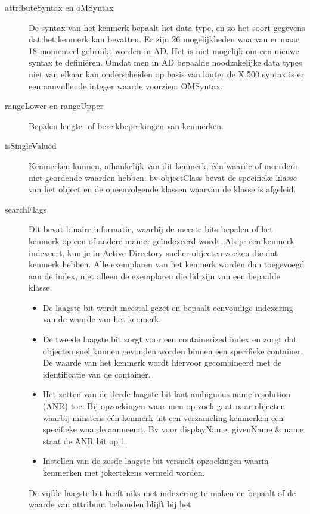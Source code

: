 \begin{description}
	\item[attributeSyntax en oMSyntax] De syntax van het kenmerk bepaalt het
		data type, en zo het soort gegevens dat het kenmerk kan
		bevatten. Er zijn 26 mogelijkheden waarvan er maar 18 momenteel
		gebruikt worden in AD. Het is niet mogelijk om een nieuwe syntax
		te definiëren. Omdat men in AD bepaalde noodzakelijke data types
		niet van elkaar kan onderscheiden op basis van louter de X.500
		syntax is er een aanvullende integer waarde voorzien: OMSyntax.
	\item[rangeLower en rangeUpper] Bepalen lengte- of bereikbeperkingen van
		kenmerken.
	\item[isSingleValued] Kenmerken kunnen, afhankelijk van dit kenmerk, één
		waarde of meerdere niet-geordende waarden hebben. bv objectClass
		bevat de specifieke klasse van het object en de opeenvolgende
		klassen waarvan de klasse is afgeleid.
	\item[searchFlags] Dit bevat binaire informatie, waarbij de meeste bits
		bepalen of het kenmerk op een of andere manier geïndexeerd
		wordt. Als je een kenmerk indexeert, kun je in Active Directory
		sneller objecten zoeken die dat kenmerk hebben. Alle exemplaren
		van het kenmerk worden dan toegevoegd aan de index, niet alleen
		de exemplaren die lid zijn van een bepaalde klasse.
		\begin{itemize}
			\item De laagste bit wordt meestal gezet en bepaalt
				eenvoudige indexering van de waarde van het
				kenmerk.
			\item De tweede laagste bit zorgt voor een containerized
				index en zorgt dat objecten snel kunnen gevonden
				worden binnen een specifieke container. De
				waarde van het kenmerk wordt hiervoor
				gecombineerd met de identificatie van de
				container.
			\item Het zetten van de derde laagste bit laat ambiguous
				name resolution (ANR) toe. Bij opzoekingen waar
				men op zoek gaat naar objecten waarbij minstens één
				kenmerk uit een verzameling kenmerken een
				specifieke waarde aanneemt. Bv voor displayName,
				givenName \& name staat de ANR bit op 1.
			\item Instellen van de zesde laagste bit versnelt
				opzoekingen waarin kenmerken met jokertekens
				vermeld worden.
		\end{itemize}
		De vijfde laagste bit heeft niks met indexering te maken en
		bepaalt of de waarde van attribuut behouden blijft bij het

\end{description}
